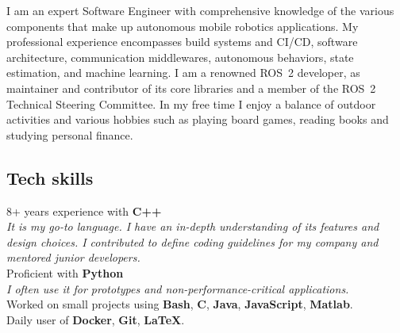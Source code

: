 \documentclass[letterpaper]{soragna-onepage-twocols} %
\begin{document}
\begin{minipage}[t]{0.3\textwidth} %



I am an expert Software Engineer with comprehensive knowledge of the various components that make up autonomous mobile robotics applications.
My professional experience encompasses build systems and CI/CD, software architecture, communication middlewares, autonomous behaviors, state estimation, and machine learning.
I am a renowned ROS~2 developer, as maintainer and contributor of its core libraries and a member of the ROS~2 Technical Steering Committee.
In my free time I enjoy a balance of outdoor activities and various hobbies such as playing board games, reading books and studying personal finance.

\sectionspace %




\vspace{-12pt} %
\sectionspace %



\subsection{Tech skills}

8+ years experience with \textbf{C++}\\
{\emph{It is my go-to language.
I have an in-depth understanding of its features and design choices.
I contributed to define coding guidelines for my company and mentored junior developers.}}\\
Proficient with \textbf{Python}\\
{\emph{I often use it for prototypes and non-performance-critical applications.}}\\
Worked on small projects using \textbf{Bash}, \textbf{C}, \textbf{Java}, \textbf{JavaScript},  \textbf{Matlab}.\\
Daily user of \textbf{Docker}, \textbf{Git}, \textbf{LaTeX}.\\


\end{minipage}
\end{document}
